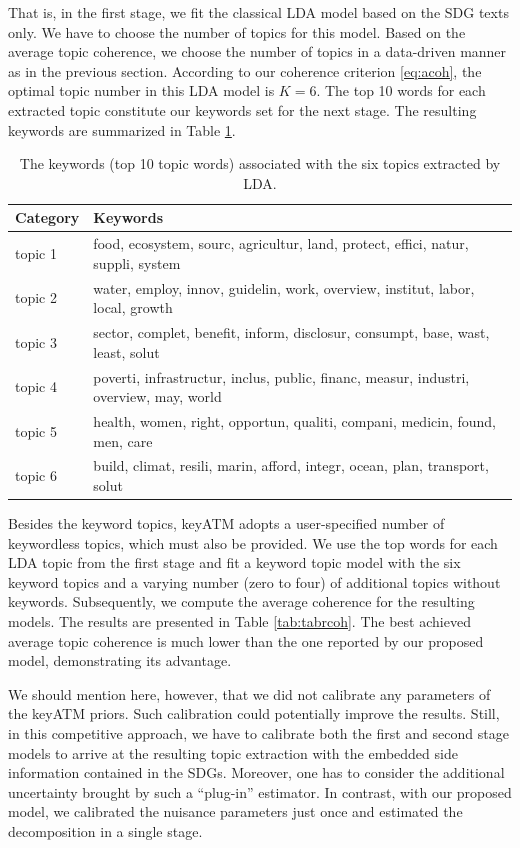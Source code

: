 \documentclass[
]{article}
\begin{document}
That is, in the first stage, we fit the classical LDA model based on the SDG texts only. We have to choose the number of topics for this model. Based on the average topic coherence, we choose the number of topics in a data-driven manner as in the previous section. According to our coherence criterion \eqref{eq:acoh}, the optimal topic number in this LDA model is \(K=6\). The top 10 words for each extracted topic constitute our keywords set for the next stage. The resulting keywords are summarized in Table \ref{tab:tabk}.

\begin{table}

\caption{\label{tab:tabk}The keywords (top 10 topic words) associated with the six topics extracted by LDA.}
\centering
\begin{tabular}[t]{l|l}
\hline
Category & Keywords\\
\hline
topic 1 & food, ecosystem, sourc, agricultur, land, protect, effici, natur, suppli, system\\
\hline
topic 2 & water, employ, innov, guidelin, work, overview, institut, labor, local, growth\\
\hline
topic 3 & sector, complet, benefit, inform, disclosur, consumpt, base, wast, least, solut\\
\hline
topic 4 & poverti, infrastructur, inclus, public, financ, measur, industri, overview, may, world\\
\hline
topic 5 & health, women, right, opportun, qualiti, compani, medicin, found, men, care\\
\hline
topic 6 & build, climat, resili, marin, afford, integr, ocean, plan, transport, solut\\
\hline
\end{tabular}
\end{table}

Besides the keyword topics, keyATM adopts a user-specified number of keywordless topics, which must also be provided. We use the top words for each LDA topic from the first stage and fit a keyword topic model with the six keyword topics and a varying number (zero to four) of additional topics without keywords. Subsequently, we compute the average coherence for the resulting models. The results are presented in Table \ref{tab:tabrcoh}. The best achieved average topic coherence is much lower than the one reported by our proposed model, demonstrating its advantage.

We should mention here, however, that we did not calibrate any parameters of the keyATM priors. Such calibration could potentially improve the results. Still, in this competitive approach, we have to calibrate both the first and second stage models to arrive at the resulting topic extraction with the embedded side information contained in the SDGs. Moreover, one has to consider the additional uncertainty brought by such a ``plug-in'' estimator. In contrast, with our proposed model, we calibrated the nuisance parameters just once and estimated the decomposition in a single stage.
\end{document}
